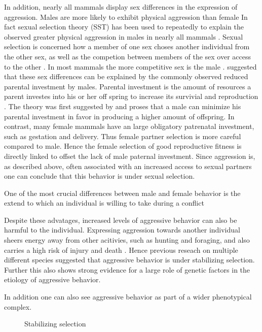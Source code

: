 In addition, nearly all mammals display sex differences in the expression of aggression.
Males are more likely to exhibit physical aggression than female
In fact sexual selection theory (SST) has been used to repeatedly to explain the observed greater physical aggression in males in nearly all mammals \cite{Archer2004,Anderson2002}. 
Sexual selection is concerned how a member of one sex choses another individual from the other sex, as well as the competion between members of the sex over access to the other \cite{Darwin1859}.
In most mammals the more competitive sex is the male \cite{Archer2009}. 
\citet{Trivers1972} suggested that these sex differences can be explained by the commonly observed reduced parental investment by males.
Parental investment is the amount of resources a parent investes into his or her off spring to increase its survivial and reproduction \cite{Archer2009}.
The theory was first suggested by \citet{0198504403} and proses that a male can minimize his parental investment in favor in producing a higher amount of offspring.
In contrast, many female mammals have an large obligatory patrenatal investment, such as gestation and delivery.
Thus female partner selection is more careful compared to male.
Hence the female selection of good reproductive fitness is directly linked to offset the lack of male paternal investment.
Since aggression is, as described above, often associated with an increased access to sexual partners one can conclude that this behavior is under sexual selection.

One of the most crucial differences between male and female behavior is the extend to which an individual is willing to take during a conflict %

Despite these advatages, increased levels of aggressive behavior can also be harmful to the individual.
Expressing aggression towards another individual sheers energy away from other acitivies, such as hunting and foraging, and also carries a high risk of injury and death \cite{Packer1995}.  
Hence previous reseach on multiple different species suggested that aggressive behavior is under stabilizing selection.
Further this also shows strong evidence for a large role of genetic factors in the etiology of aggressive behavior. 


In addition one can also see aggressive behavior as part of a wider phenotypical complex. 

\begin{figure}
	\centering
	\scalebox{0.8}{}
	\caption{Stabilizing selection}
	\label{fig:stab}
\end{figure}



